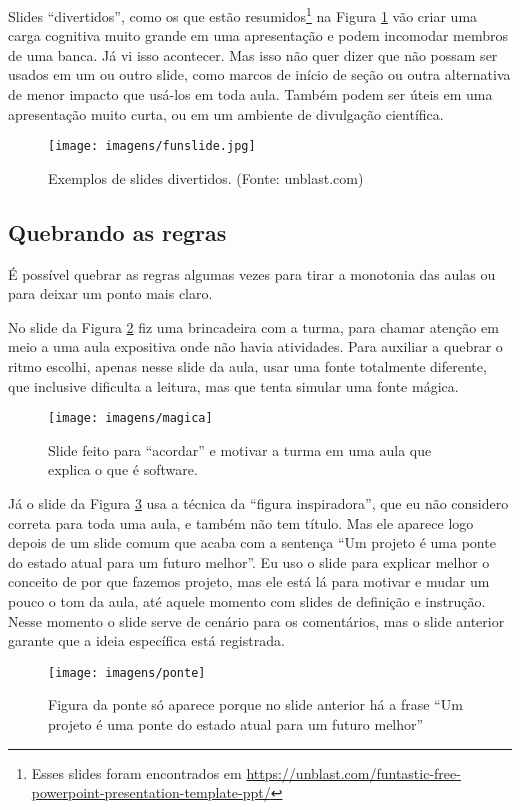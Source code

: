 Slides ``divertidos'', como os que estão resumidos\footnote{Esses slides foram encontrados em     \url{https://unblast.com/funtastic-free-powerpoint-presentation-template-ppt/}
} na Figura \ref{fig:fun} vão criar uma carga cognitiva muito grande em uma apresentação e podem incomodar membros de uma banca. Já vi isso acontecer. Mas isso não quer dizer que não possam ser usados em um ou outro slide, como marcos de início de seção ou outra alternativa de menor impacto que usá-los em toda aula. Também podem ser úteis em uma apresentação muito curta, ou em um ambiente de divulgação científica.

\begin{figure}[hbt]
    \centering
    \texttt{[image: imagens/funslide.jpg]}
    \caption{Exemplos de slides divertidos.
        (Fonte: unblast.com) }
    \label{fig:fun}
\end{figure}

\subsection{Quebrando as regras}

É possível quebrar as regras algumas vezes para tirar a monotonia das aulas ou para deixar um ponto mais claro.

No slide da Figura \ref{fig:magica} fiz uma brincadeira com a turma, para chamar atenção em meio a uma aula expositiva onde não havia atividades. Para auxiliar a quebrar o ritmo escolhi, apenas nesse slide da aula, usar uma fonte totalmente diferente, que inclusive dificulta  a leitura, mas que tenta simular uma fonte mágica.

\begin{figure}[tbh]
    \centering
    \texttt{[image: imagens/magica]}
    \caption{Slide feito para ``acordar'' e motivar a turma em uma aula que explica o que é software.}
    \label{fig:magica}
\end{figure}

Já o slide da Figura \ref{fig:ponte} usa a técnica da ``figura inspiradora'', que eu não considero correta para toda uma aula, e também não tem título. Mas ele aparece logo depois de um slide comum que acaba com a sentença ``Um projeto é uma ponte do estado atual para um futuro melhor''. Eu uso o slide para explicar melhor o conceito de por que fazemos projeto, mas ele está lá para motivar e mudar um pouco o tom da aula, até aquele momento com slides de definição e instrução. Nesse momento o slide serve de cenário para os comentários, mas o slide anterior garante que a ideia específica está registrada.

\begin{figure}[tbh]
    \centering
    \texttt{[image: imagens/ponte]}
    \caption{Figura da ponte só aparece porque no slide anterior há a frase ``Um projeto é uma ponte do estado atual para um futuro melhor''}
    \label{fig:ponte}
\end{figure}

